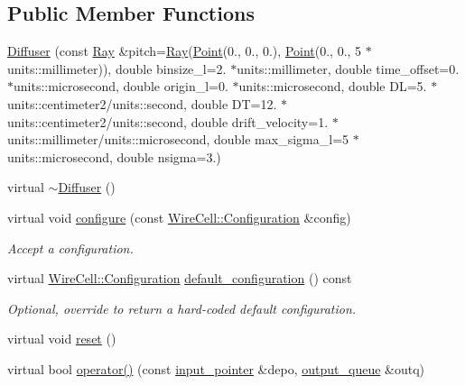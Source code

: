 \subsection*{Public Member Functions}
\begin{DoxyCompactItemize}
\item 
\hyperlink{class_wire_cell_1_1_diffuser_ae3799af3be7fe101ddeaacea1c1b4903}{Diffuser} (const \hyperlink{namespace_wire_cell_a3ab20d9b438feb7eb1ffaab9ba98af0c}{Ray} \&pitch=\hyperlink{namespace_wire_cell_a3ab20d9b438feb7eb1ffaab9ba98af0c}{Ray}(\hyperlink{namespace_wire_cell_ab2b2565fa6432efbb4513c14c988cda9}{Point}(0., 0., 0.), \hyperlink{namespace_wire_cell_ab2b2565fa6432efbb4513c14c988cda9}{Point}(0., 0., 5 $\ast$units\+::millimeter)), double binsize\+\_\+l=2. $\ast$units\+::millimeter, double time\+\_\+offset=0. $\ast$units\+::microsecond, double origin\+\_\+l=0. $\ast$units\+::microsecond, double DL=5. $\ast$units\+::centimeter2/units\+::second, double DT=12. $\ast$units\+::centimeter2/units\+::second, double drift\+\_\+velocity=1. $\ast$units\+::millimeter/units\+::microsecond, double max\+\_\+sigma\+\_\+l=5 $\ast$units\+::microsecond, double nsigma=3.)
\item 
virtual \hyperlink{class_wire_cell_1_1_diffuser_a17f86117d655968d3d46bf25aa92f5eb}{$\sim$\+Diffuser} ()
\item 
virtual void \hyperlink{class_wire_cell_1_1_diffuser_a494d8aa964610d4b129f4305630491f6}{configure} (const \hyperlink{namespace_wire_cell_a9f705541fc1d46c608b3d32c182333ee}{Wire\+Cell\+::\+Configuration} \&config)
\begin{DoxyCompactList}\small\item\em Accept a configuration. \end{DoxyCompactList}\item 
virtual \hyperlink{namespace_wire_cell_a9f705541fc1d46c608b3d32c182333ee}{Wire\+Cell\+::\+Configuration} \hyperlink{class_wire_cell_1_1_diffuser_a9f2f7a5bae385df91a7a9c1ef035f3a6}{default\+\_\+configuration} () const
\begin{DoxyCompactList}\small\item\em Optional, override to return a hard-\/coded default configuration. \end{DoxyCompactList}\item 
virtual void \hyperlink{class_wire_cell_1_1_diffuser_abeacee310fe7c9ec3067c679319c33bd}{reset} ()
\item 
virtual bool \hyperlink{class_wire_cell_1_1_diffuser_a05506f9621f1221253d4d4f6701ca180}{operator()} (const \hyperlink{class_wire_cell_1_1_i_queuedout_node_acf5f716a764553f3c7055a9cf67e906e}{input\+\_\+pointer} \&depo, \hyperlink{class_wire_cell_1_1_i_queuedout_node_a39018e4e3dd886befac9636ac791a685}{output\+\_\+queue} \&outq)

\end{DoxyCompactItemize}
